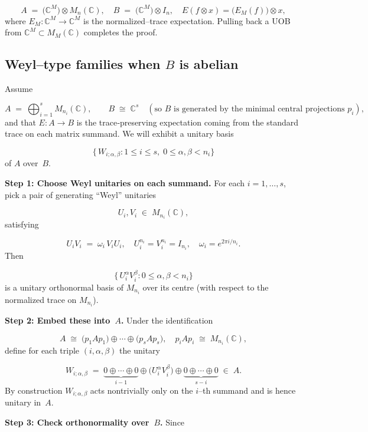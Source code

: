 \documentclass[11pt]{article}
\theoremstyle{mytheoremstyle}
\theoremstyle{definition}
\theoremstyle{remark}
\newcommand{\bbC}{\mathbb{C}}
\begin{document}
\[
 A \;=\ \bigl(\bbC^M\bigr)\otimes M_n(\bbC),
 \quad
 B \;=\;\bigl(\bbC^M\bigr)\otimes I_n, \quad
 E(f\otimes x)
 =\bigl(E_M(f)\bigr)\otimes x,
\]
where \(E_M\colon \bbC^M\to\bbC^M\) is the normalized–trace expectation.
Pulling back a UOB from \(\bbC^M\subset M_M(\bbC)\) completes the proof.
\hfill\qedsymbol


\subsection{Weyl–type families when $B$ is abelian}
\label{sec:weyl}

Assume

\[
  A \;=\ \bigoplus_{i=1}^{s} M_{n_i}(\mathbb{C}), \qquad
  B \;\cong\;\bbC^s
  \quad(\text{so $B$ is generated by the minimal central projections }p_i),
\]
and that $E\colon A\to B$ is the trace‐preserving expectation coming from the
standard trace on each matrix summand.  We will exhibit a unitary basis

$$ 
  \bigl\{\,W_{i;\alpha,\beta}:1\le i\le s,\;0\le\alpha,\beta<n_i\bigr\} 
$$ 
of $A$ over~$B$.

\medskip
\noindent\textbf{Step 1: Choose Weyl unitaries on each summand.} For each $i=1,\dots,s$, pick a pair of generating “Weyl” unitaries

\[
  U_i,V_i\;\in\;M_{n_i}(\mathbb{C}),
\]
satisfying

\[
  U_i V_i \;=\;\omega_i\,V_i U_i,
  \quad
  U_i^{n_i}=V_i^{n_i}=I_{n_i},
  \quad
  \omega_i=e^{2\pi i/n_i}.
\]
Then

\[
  \bigl\{\,U_i^\alpha V_i^\beta
  : 0\le\alpha,\beta<n_i\bigr\}
\]
is a unitary orthonormal basis of $M_{n_i}$ over its centre
(with respect to the normalized trace on $M_{n_i}$).

\medskip
\noindent\textbf{Step 2: Embed these into~$A$.} Under the identification

\[
  A \;\cong\; \bigl(p_1Ap_1\bigr)\oplus\cdots\oplus\bigl(p_sAp_s\bigr), \quad
  p_iAp_i\;\cong\;M_{n_i}(\mathbb{C}),
\]
define for each triple $(i,\alpha,\beta)$ the unitary

\[
  W_{i;\alpha,\beta}
  \;=\; 
  \underbrace{0\oplus\cdots\oplus 0}_{i-1}
  \oplus
  \bigl(U_i^\alpha V_i^\beta\bigr)
  \oplus
  \underbrace{0\oplus\cdots\oplus 0}_{s-i}
  \;\in\;A.
\]
By construction $W_{i;\alpha,\beta}$ acts nontrivially only on the
$i$–th summand and is hence unitary in~$A$.

\medskip
\noindent\textbf{Step 3: Check orthonormality over~$B$.} Since 
\end{document}
